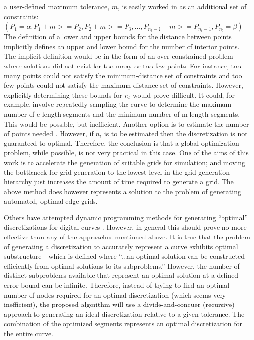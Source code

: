 \documentclass[preprint,12pt]{elsarticle}
\begin{document}
a user-defined maximum tolerance, $m$, is easily worked in as an additional set of constraints: \\
$(P_1 = \alpha, P_1+m >= P_2, P_2+m >= P_3, … , P_{n_t-2}+ m >= P_{n_t-1}, P_{n_t} = \beta)$ \\

\noindent The definition of a lower and upper bounds for the distance between points implicitly defines an upper and lower bound for the number of interior points.  The implicit definition would be in the form of an over-constrained problem where solutions did not exist for too many or too few points.  For instance, too many points could not satisfy the minimum-distance set of constraints and too few points could not satisfy the maximum-distance set of constraints.  However, explicitly determining these bounds for $n_t$ would prove difficult.  It could, for example, involve repeatedly sampling the curve to determine the maximum number of e-length segments and the minimum number of m-length segments.  This would be possible, but inefficient.  Another option is to estimate the number of points needed \cite{cuilliere97}.  However, if $n_t$ is to be estimated then the discretization is not guaranteed to optimal. Therefore, the conclusion is that a global optimization problem, while possible, is not very practical in this case.  One of the aims of this work is to accelerate the generation of suitable grids for simulation; and moving the bottleneck for grid generation to the lowest level in the grid generation hierarchy just increases the amount of time required to generate a grid.  The above method does however represents a solution to the problem of generating automated, optimal edge-grids.

Others have attempted dynamic programming methods for generating ``optimal'' discretizations for digital curves \cite{horng02}.  However, in general this should prove no more effective than any of the approaches mentioned above.  It is true that the problem of generating a discretization to accurately represent a curve exhibits optimal substructure—which is defined where ``...an optimal solution can be constructed efficiently from optimal solutions to its subproblems.'' \cite{cormen01}  However, the number of distinct subproblems available that represent an optimal solution at a defined error bound can be infinite.  Therefore, instead of trying to find an optimal number of nodes required for an optimal discretization (which seems very inefficient), the proposed algorithm will use a divide-and-conquer (recursive) approach to generating an ideal discretization relative to a given tolerance.  The combination of the optimized segments represents an optimal discretization for the entire curve.
\end{document}
